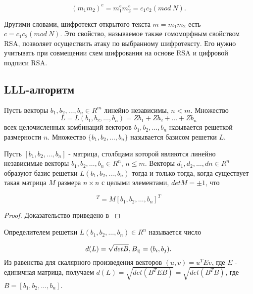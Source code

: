     \begin{equation}
      (m_1 m_2)^e = m_1^e m_2^e = c_1 c_2 (mod \: N).
    \end{equation}

  Другими словами, шифротекст открытого текста $m = m_1 m_2$ есть \\ $c = c_1 c_2 (mod \: N)$. Это свойство, называемое также гомоморфным 
  свойством  RSA, позволяет осуществить атаку по выбранному шифротексту. Его нужно учитывать при совмещении схем шифрования на основе RSA и цифровой подписи
  RSA.

\subsection{LLL-алгоритм}

  \begin{definition}
    Пусть векторы $ b_1, b_2, \dots, b_n \in R^m$ линейно независимы, $n < m$. Множество 
      \begin{equation}
	       L=L(b_1, b_2, \dots, b_n) = Zb_1 + Zb_2 + \dots + Zb_n
      \end{equation}    
    всех целочисленных комбинаций векторов $ b_1, b_2, \dots, b_n$ называется решеткой размерности $n$. Множество
    $ \{b_1, b_2, \dots, b_n \} $ называется базисом решетки $L$.
  \end{definition}
  
  \begin{theorem}
    Пусть {$[b_1, b_2, \dots, b_n]$} - матрица, столбцами которой являются линейно независимые векторы {$ b_1, b_2, \dots, b_n \in R^n$}, {$n \le m$}.
    Векторы $ d_1, d_2, \dots, dn \in R^n$ образуют базис решетки {$L(b_1, b_2, \dots, b_n)$} тогда и только тогда, когда существует такая матрица
    {$M$} размера {$n \times n$} с целыми элементами, {$detM = \pm 1$}, что
    
      \begin{equation}
        [d_1, d_2, \dots, d_n]^T = M [b_1, b_2, \dots, b_n]^T
      \end{equation}

      \begin{proof}
        Доказательство приведено в \cite[Глава 8.2, страница 260]{mah06}
      \end{proof}
  \end{theorem}  

  \begin{definition}
   Определителем решетки {$L(b_1,b_2, \dots, b_n) \in R^n$} называется число
   
   \begin{equation}
    d(L) = \sqrt{detB}, B\textsubscript{ij} = (b_i, b_j).
   \end{equation}
   Из равенства для скалярного произведения векторов {$(u, v) = u^T E v$}, где $E$ - единичная матрица, получаем 
   $d(L) = \sqrt{det(B^TEB)} = \sqrt{det(B^TB)}$, где {$B = [b_1,b_2, \dots, b_n]$}.
  \end{definition}
  
